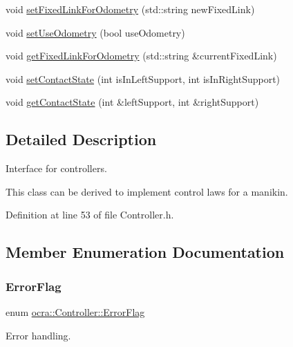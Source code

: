 \begin{DoxyCompactItemize}
\item 
void \hyperlink{classocra_1_1Controller_aac8c56f6b63bb3ae57ac7bf9c23018e8}{set\+Fixed\+Link\+For\+Odometry} (std\+::string new\+Fixed\+Link)
\item 
void \hyperlink{classocra_1_1Controller_a3f6a080793612b0b66e1ce7a26897646}{set\+Use\+Odometry} (bool use\+Odometry)
\item 
void \hyperlink{classocra_1_1Controller_ad134da18dc753e50e6f615373fbf9adf}{get\+Fixed\+Link\+For\+Odometry} (std\+::string \&current\+Fixed\+Link)
\item 
void \hyperlink{classocra_1_1Controller_aa0b365af3cab4a8dc1a3ba3af6a073f0}{set\+Contact\+State} (int is\+In\+Left\+Support, int is\+In\+Right\+Support)
\item 
void \hyperlink{classocra_1_1Controller_a41e0a7fb9fd30c5b58640dd49be10d44}{get\+Contact\+State} (int \&left\+Support, int \&right\+Support)
\end{DoxyCompactItemize}


\subsection{Detailed Description}
Interface for controllers. 

This class can be derived to implement control laws for a manikin. 

Definition at line 53 of file Controller.\+h.



\subsection{Member Enumeration Documentation}
\hypertarget{classocra_1_1Controller_abeaf3673abe2da79493638dcc49fcf6e}{}\label{classocra_1_1Controller_abeaf3673abe2da79493638dcc49fcf6e} 
\subsubsection{\texorpdfstring{Error\+Flag}{ErrorFlag}}
{\footnotesize\ttfamily enum \hyperlink{classocra_1_1Controller_abeaf3673abe2da79493638dcc49fcf6e}{ocra\+::\+Controller\+::\+Error\+Flag}}



Error handling. 

